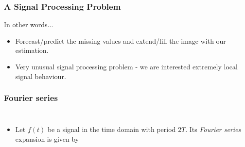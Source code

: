 \documentclass{beamer}
\begin{document}
\begin{frame}
\frametitle{A Signal Processing Problem}

In other words...

\begin{itemize}
	\item Forecast/predict the missing values and extend/fill the image with our estimation.
	\item Very unusual signal processing problem - we are interested extremely local signal behaviour. 
\end{itemize}

\end{frame}



\begin{frame}
\frametitle{Fourier series}
\begin{columns}[c]
\begin{itemize}
	\item Let $f(t)$ be a signal in the time domain with period $2T$. Its 
		\textit{Fourier series} expansion is given by


\end{itemize}
\end{columns}
\end{frame}
\end{document}
